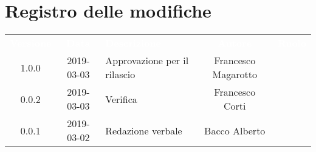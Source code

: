 \section*{Registro delle modifiche}
{
	\renewcommand{\arraystretch}{1.5}
	\centering
	\begin{longtable}{ c c  C{4cm}  c  c }
		
		\textcolor{white}{\textbf{Versione}} & \textcolor{white}{\textbf{Data}} & \textcolor{white}{\textbf{Descrizione}} & \textcolor{white}{\textbf{Autore}} & \textcolor{white}{\textbf{Ruolo}}\\
		1.0.0 & 2019-03-03 & Approvazione per il rilascio & Francesco Magarotto & \Res{}\\
		0.0.2 & 2019-03-03 & Verifica & Francesco Corti & \ver{}\\
		0.0.1 & 2019-03-02 & Redazione verbale & Bacco Alberto & \reda{}\\
		
		
	\end{longtable}
	
}